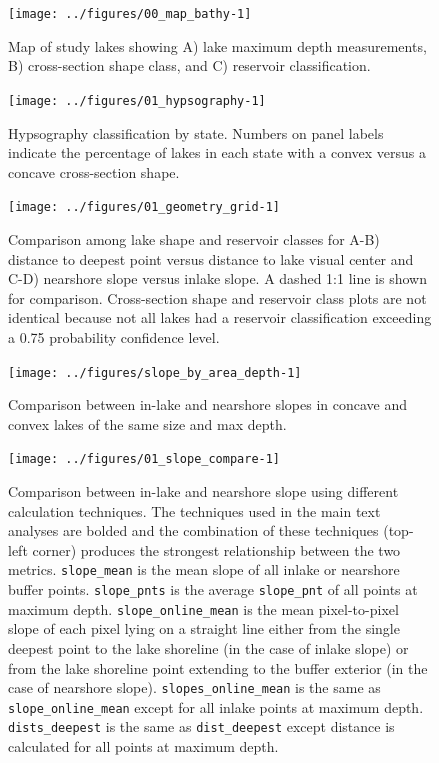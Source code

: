 \documentclass[draft,wrr]{agutexSI2019}
\begin{document}
\clearpage

\begin{figure}
      \begin{center}\texttt{[image: ../figures/00\_map\_bathy-1]}\end{center}
      \caption{Map of study lakes showing A) lake maximum depth measurements, B) cross-section shape class, and C) reservoir classification.}\label{figS2}
      \end{figure}

\begin{figure}
      \noindent\texttt{[image: ../figures/01\_hypsography-1]}
      \caption{Hypsography classification by state. Numbers on panel labels indicate the percentage of lakes in each state with a convex versus a concave cross-section shape.}\label{figS3}
      \end{figure}

\begin{figure}
      \noindent\texttt{[image: ../figures/01\_geometry\_grid-1]}
      \caption{Comparison among lake shape and reservoir classes for A-B) distance to deepest point versus distance to lake visual center and C-D) nearshore slope versus inlake slope. A dashed 1:1 line is shown for comparison. Cross-section shape and reservoir class plots are not identical because not all lakes had a reservoir classification exceeding a 0.75 probability confidence level.}\label{figS4}
      \end{figure}

\begin{figure}
      \begin{center}
        \texttt{[image: ../figures/slope\_by\_area\_depth-1]}
      \end{center}
      \caption{Comparison between in-lake and nearshore slopes in concave and convex lakes of the same size and max depth.}\label{figS5}
    \end{figure}
\clearpage

\begin{figure}
      \begin{center}
        \texttt{[image: ../figures/01\_slope\_compare-1]}
      \end{center}
      \caption{Comparison between in-lake and nearshore slope using different calculation techniques. The techniques used in the main text analyses are bolded and the combination of these techniques (top-left corner) produces the strongest relationship between the two metrics. \texttt{slope\_mean} is the mean slope of all inlake or nearshore buffer points. \texttt{slope\_pnts} is the average \texttt{slope\_pnt} of all points at maximum depth. \texttt{slope\_online\_mean} is the mean pixel-to-pixel slope of each pixel lying on a straight line either from the single deepest point to the lake shoreline (in the case of inlake slope) or from the lake shoreline point extending to the buffer exterior (in the case of nearshore slope). \texttt{slopes\_online\_mean} is the same as \texttt{slope\_online\_mean} except for all inlake points at maximum depth. \texttt{dists\_deepest} is the same as \texttt{dist\_deepest} except distance is calculated for all points at maximum depth.}\label{figS6}
    \end{figure}
\clearpage
\end{document}
